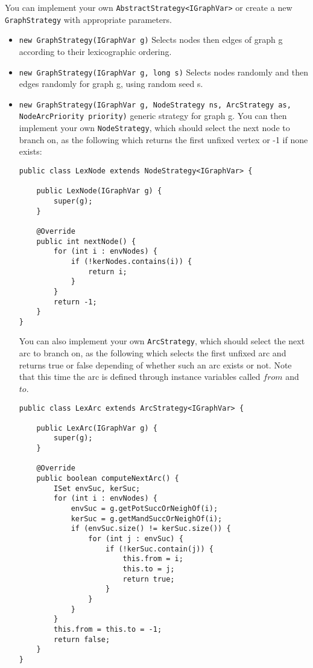 \documentclass{article}
\begin{document}
You can implement your own \texttt{AbstractStrategy<IGraphVar>} or create a new \texttt{GraphStrategy} with appropriate parameters. 

\begin{itemize}
\item  \texttt{new GraphStrategy(IGraphVar g)} Selects nodes then edges of graph g according to their lexicographic ordering.
\item  \texttt{new GraphStrategy(IGraphVar g, long s)} Selects nodes randomly and then edges randomly for graph g, using random seed s. 
\item  \texttt{new GraphStrategy(IGraphVar g, NodeStrategy ns, ArcStrategy as, NodeArcPriority priority)} generic strategy for graph g. You can then implement your own \texttt{NodeStrategy}, which should select the next node to branch on, as the following which returns the first unfixed vertex or -1 if none exists: 

\begin{lstlisting}
public class LexNode extends NodeStrategy<IGraphVar> {

	public LexNode(IGraphVar g) {
		super(g);
	}

	@Override
	public int nextNode() {
		for (int i : envNodes) {
			if (!kerNodes.contains(i)) {
				return i;
			}
		}
		return -1;
	}
}
\end{lstlisting}

You can also implement your own \texttt{ArcStrategy}, which should select the next arc to branch on, as the following which selects the first unfixed arc and returns true or false depending of whether such an arc exists or not. 
Note that this time the arc is defined through instance variables called $from$ and $to$. 
\begin{lstlisting}
public class LexArc extends ArcStrategy<IGraphVar> {

	public LexArc(IGraphVar g) {
		super(g);
	}

	@Override
	public boolean computeNextArc() {
		ISet envSuc, kerSuc;
		for (int i : envNodes) {
			envSuc = g.getPotSuccOrNeighOf(i);
			kerSuc = g.getMandSuccOrNeighOf(i);
			if (envSuc.size() != kerSuc.size()) {
				for (int j : envSuc) {
					if (!kerSuc.contain(j)) {
						this.from = i;
						this.to = j;
						return true;
					}
				}
			}
		}
		this.from = this.to = -1;
		return false;
	}
}
\end{lstlisting}

\end{itemize}
\end{document}
